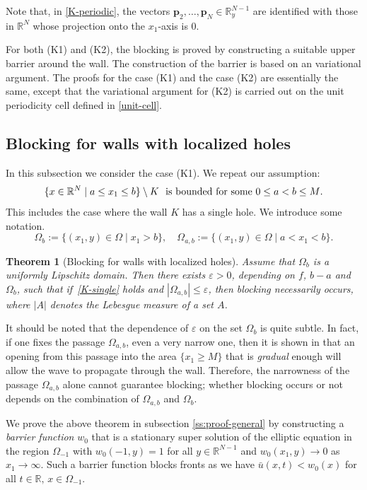 \documentclass[a4paper,12pt,fullpage]{article}
\numberwithin{equation}{section}
\newtheorem{Thm}{Theorem}
\def\R{{\mathbb R}}
\def\ep{\varepsilon}
\begin{document}
Note that, in \eqref{K-periodic}, the vectors ${\boldsymbol p}_2, \ldots, {\boldsymbol p}_{N}\in \R^{N-1}_y$ are identified with those in $\R^N$ whose projection onto the $x_1$-axis is $0$.

For both (K1) and (K2), the blocking is proved by constructing a suitable upper barrier around the wall. The construction of the barrier is based on an variational argument. The proofs for the case (K1) and the case (K2) are essentially the same, except that the variational argument for (K2) is carried out on the unit periodicity cell defined in \eqref{unit-cell}.


\subsection{Blocking for walls with localized holes}\label{ss:main-blocking-localized}

In this subsection we consider the case (K1). We repeat our assumption:
\begin{equation}\label{K-single}
\{x\in\R^N\mid a\leq x_1\leq b\} \setminus K \ \ \hbox{is bounded for some $0\leq a<b\leq M$.}
\end{equation}
This includes the case where the wall $K$ has a single hole. We introduce some notation.
\[
\Omega_{b}:= \{ (x_{1}, y) \in \Omega\mid x_{1}> b \},\quad \Omega_{a, b}:= \{ (x_{1}, y) \in \Omega\mid a< x_{1} < b \}.
\]

\begin{Thm}[Blocking for walls with localized holes]\label{th:blocking-localized}
Assume that $\Omega_{b}$ is a uniformly Lipschitz domain. Then there exists $\ep>0$, depending on $f$, $b-a$ and $\Omega_b$, such that if~\eqref{K-single} holds and $|\Omega_{a,b}| \leq \ep$, then blocking necessarily occurs, where  $|A|$ denotes the Lebesgue measure of a set $A$.
\end{Thm}

It should be noted that the dependence of $\ep$ on the set $\Omega_b$ is quite subtle. In fact, if one fixes the passage $\Omega_{a, b}$, even a very narrow one, then it is shown in \cite{BBC} that an opening from this passage into the area $\{x_1\geq M\}$ that is {\em gradual} enough will allow the wave to propagate through the wall. Therefore, the narrowness of the passage $\Omega_{a,b}$ alone cannot guarantee blocking; whether blocking occurs or not depends on the combination of $\Omega_{a,b}$ and $\Omega_b$. 

We prove the above theorem in subsection \ref{ss:proof-general} by constructing a {\em barrier function} $w_{0}$ that is a stationary super solution of the elliptic equation in the region $\Omega_{-1}$ with $w_{0}(-1, y) = 1$ for all $y\in \R^{N-1}$ and $w_{0}(x_{1}, y) \to 0$ as $x_{1}\to \infty$. Such a barrier function blocks fronts as we have $\bar{u}(x,t)<w_{0}(x)$ for all $t\in\R,\,x\in\Omega_{-1}$.
\end{document}
